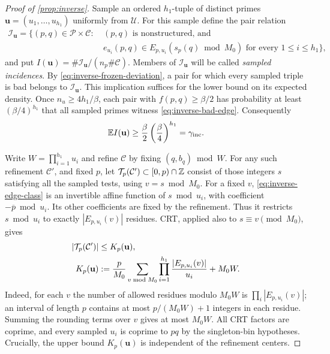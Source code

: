 \begin{proof}[Proof of \cref{prop:inverse}]
Sample an ordered \(h_1\)-tuple of distinct primes
\(\mathbf u=(u_1,\ldots,u_{h_1})\) uniformly from \(\mathcal U\).
For this sample define the pair relation
\[
\begin{split}
 \mathcal I_{\mathbf u}=\bigl\{(p,q)\in\mathcal P\times\mathcal C:
 &\ (p,q)\text{ is nonstructured, and}\\
 &\ e_{u_i}(p,q)\in E_{p,u_i}(s_p(q)\bmod M_0)
       \text{ for every }1\le i\le h_1\bigr\},
\end{split}
\]
and put \(I(\mathbf u)=\#\mathcal I_{\mathbf u}/(n_p\#\mathcal C)\).
Members of \(\mathcal I_{\mathbf u}\) will be called \emph{sampled
incidences}. By \eqref{eq:inverse-frozen-deviation}, a pair for which
every sampled triple is bad belongs to \(\mathcal I_{\mathbf u}\).
This implication suffices for the lower bound on its expected density.
Once \(n_u\ge4h_1/\beta\), each pair with \(f(p,q)\ge\beta/2\) has probability
at least \((\beta/4)^{h_1}\) that all sampled primes witness
\eqref{eq:inverse-bad-edge}.
Consequently
\begin{equation}
 \mathbb E I(\mathbf u)\ge
 \frac{\beta}{2}\left(\frac{\beta}{4}\right)^{h_1}
       =\gamma_{\rm inc}.
 \label{eq:inverse-incidence-expectation}
\end{equation}

Write \(W=\prod_{i=1}^{h_1}u_i\) and refine \(\mathcal C\) by fixing
\((q,b_q)\bmod W\).  For any such refinement \(\mathcal C'\), and
fixed \(p\), let \(\mathcal T_p(\mathcal C')\subset[0,p)\cap\mathbb Z\)
consist of those integers \(s\) satisfying all the sampled tests,
using \(v=s\bmod M_0\).
For a fixed \(v\), \eqref{eq:inverse-edge-class} is an invertible
affine function of \(s\bmod u_i\), with coefficient
\(-\overline p\bmod u_i\).
Its other coefficients are fixed by the refinement.
Thus it restricts \(s\bmod u_i\) to exactly
\(|E_{p,u_i}(v)|\) residues.
CRT, applied also to \(s\equiv v\pmod {M_0}\), gives
\begin{align}
 |\mathcal T_p(\mathcal C')|
 &\le K_p(\mathbf u),\notag\\
 K_p(\mathbf u)
 &:=
 \frac{p}{M_0}\sum_{v\bmod M_0}
       \prod_{i=1}^{h_1}\frac{|E_{p,u_i}(v)|}{u_i}
       +M_0 W .
 \label{eq:inverse-crt-slopes}
\end{align}
Indeed, for each \(v\) the number of allowed residues modulo \(M_0W\)
is \(\prod_i|E_{p,u_i}(v)|\); an interval of length \(p\) contains at
most \(p/(M_0W)+1\) integers in each residue.
Summing the rounding terms over \(v\) gives at most \(M_0W\).
All CRT factors are coprime, and every sampled \(u_i\) is coprime to
\(pq\) by the singleton-bin hypotheses.
Crucially, the upper bound \(K_p(\mathbf u)\) is independent of the
refinement centers.


\end{proof}
